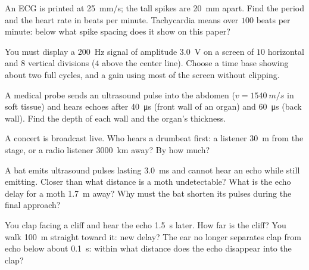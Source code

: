 \begin{exercise}[$\star\star$]\label{exo:g10:signals-and-waves:8}
An ECG is printed at \qty{25}{mm/s}; the tall spikes are \qty{20}{mm}
apart. Find the period and the heart rate in beats per minute.
Tachycardia means over $100$ beats per minute: below what spike spacing
does it show on this paper?
\end{exercise}

\begin{exercise}[$\star\star$]\label{exo:g10:signals-and-waves:9}
You must display a \qty{200}{Hz} signal of amplitude \qty{3.0}{V} on a
screen of $10$ horizontal and $8$ vertical divisions ($4$ above the
center line). Choose a time base showing about two full cycles, and a
gain using most of the screen without clipping.
\end{exercise}

\begin{exercise}[$\star\star$]\label{exo:g10:signals-and-waves:10}
A medical probe sends an ultrasound pulse into the abdomen
($v = \qty{1540}{m/s}$ in soft tissue) and hears echoes after
\qty{40}{\micro s} (front wall of an organ) and \qty{60}{\micro s} (back
wall). Find the depth of each wall and the organ's thickness.
\end{exercise}

\begin{exercise}[$\star\star$]\label{exo:g10:signals-and-waves:11}
A concert is broadcast live. Who hears a drumbeat first: a listener
\qty{30}{m} from the stage, or a radio listener \qty{3000}{km} away? By
how much?
\end{exercise}

\begin{exercise}[$\star\star\star$]\label{exo:g10:signals-and-waves:12}
A bat emits ultrasound pulses lasting \qty{3.0}{ms} and cannot hear an
echo while still emitting. Closer than what distance is a moth
undetectable? What is the echo delay for a moth \qty{1.7}{m} away? Why
must the bat shorten its pulses during the final approach?
\end{exercise}

\begin{exercise}[$\star\star\star$]\label{exo:g10:signals-and-waves:13}
You clap facing a cliff and hear the echo \qty{1.5}{s} later. How far is
the cliff? You walk \qty{100}{m} straight toward it: new delay? The ear
no longer separates clap from echo below about \qty{0.1}{s}: within what
distance does the echo disappear into the clap?
\end{exercise}

